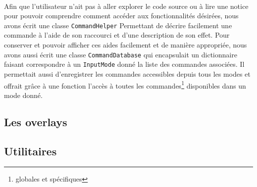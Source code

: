 \paragraph{}
Afin que l'utilisateur n'ait pas à aller explorer le code source ou à lire une
notice pour pouvoir comprendre comment accéder aux fonctionnalités désirées,
nous avons écrit une classe \verb!CommandHelper! Permettant de décrire
facilement une commande à l'aide de son raccourci et d'une description de son
effet. Pour conserver et pouvoir afficher ces aides facilement et de manière
appropriée, nous avons aussi écrit une classe \verb!CommandDatabase! qui
encapsulait un dictionnaire faisant correspondre à un \verb!InputMode! donné
la liste des commandes associées. Il permettait aussi d'enregistrer les
commandes accessibles depuis tous les modes et offrait grâce à une fonction
l'accès à toutes les commandes\footnote{globales et spécifiques} disponibles
dans un mode donné.

\subsection{Les overlays}

\subsection{Utilitaires}
